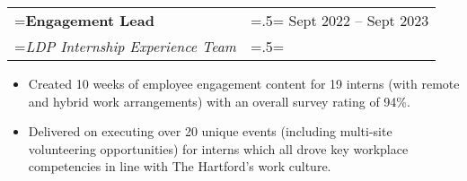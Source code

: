 \documentclass{article}
\begin{document}
\hspace{-1em}
\begin{tabularx}{\textwidth}{
    >{\raggedright\arraybackslash\hsize=1.5\hsize\linewidth=\hsize}X
    >{\raggedleft\arraybackslash\hsize=.5\hsize\linewidth=\hsize}X }
    \textbf{Engagement Lead} & Sept 2022 -- Sept 2023\\
    \textit{LDP Internship Experience Team} & \\
\end{tabularx}
\vspace{-.5em}
\begin{itemize}[label={--}, leftmargin=1em]
    \setlength\itemsep{0em}
    \item Created 10 weeks of employee engagement content for 19 interns (with remote and hybrid work arrangements) with an overall survey rating of 94\%.
    \item Delivered on executing over 20 unique events (including multi-site volunteering opportunities) for interns which all drove key workplace competencies in line with The Hartford's work culture.
\end{itemize}


\end{document}
